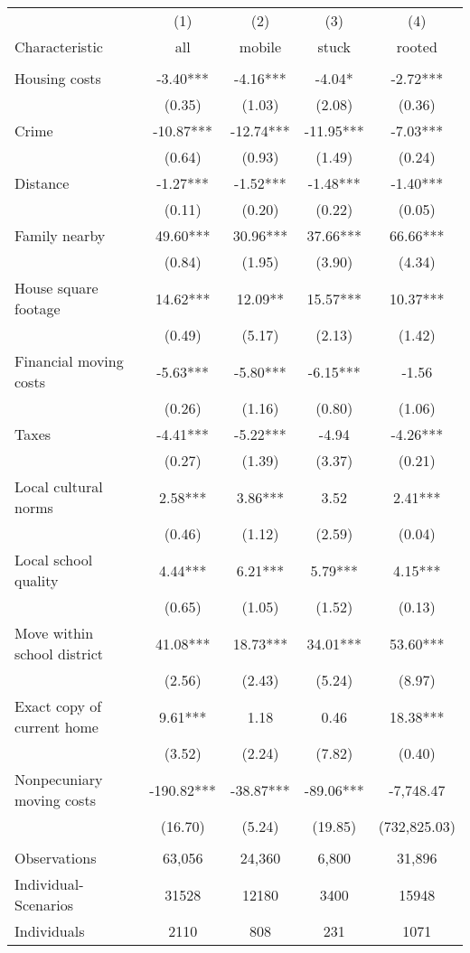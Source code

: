 \begin{tabular}{lcccc} \hline
 & (1) & (2) & (3) & (4) \\
Characteristic & all & mobile & stuck & rooted \\ \hline
 &  &  &  &  \\
Housing costs & -3.40*** & -4.16*** & -4.04* & -2.72*** \\
 & (0.35) & (1.03) & (2.08) & (0.36) \\
Crime & -10.87*** & -12.74*** & -11.95*** & -7.03*** \\
 & (0.64) & (0.93) & (1.49) & (0.24) \\
Distance & -1.27*** & -1.52*** & -1.48*** & -1.40*** \\
 & (0.11) & (0.20) & (0.22) & (0.05) \\
Family nearby & 49.60*** & 30.96*** & 37.66*** & 66.66*** \\
 & (0.84) & (1.95) & (3.90) & (4.34) \\
House square footage & 14.62*** & 12.09** & 15.57*** & 10.37*** \\
 & (0.49) & (5.17) & (2.13) & (1.42) \\
Financial moving costs & -5.63*** & -5.80*** & -6.15*** & -1.56 \\
 & (0.26) & (1.16) & (0.80) & (1.06) \\
Taxes & -4.41*** & -5.22*** & -4.94 & -4.26*** \\
 & (0.27) & (1.39) & (3.37) & (0.21) \\
Local cultural norms & 2.58*** & 3.86*** & 3.52 & 2.41*** \\
 & (0.46) & (1.12) & (2.59) & (0.04) \\
Local school quality & 4.44*** & 6.21*** & 5.79*** & 4.15*** \\
 & (0.65) & (1.05) & (1.52) & (0.13) \\
Move within school district & 41.08*** & 18.73*** & 34.01*** & 53.60*** \\
 & (2.56) & (2.43) & (5.24) & (8.97) \\
Exact copy of current home & 9.61*** & 1.18 & 0.46 & 18.38*** \\
 & (3.52) & (2.24) & (7.82) & (0.40) \\
Nonpecuniary moving costs & -190.82*** & -38.87*** & -89.06*** & -7,748.47 \\
 & (16.70) & (5.24) & (19.85) & (732,825.03) \\
 &  &  &  &  \\
Observations & 63,056 & 24,360 & 6,800 & 31,896 \\
Individual-Scenarios & 31528 & 12180 & 3400 & 15948 \\
 Individuals & 2110 & 808 & 231 & 1071 \\ \hline
\end{tabular}
